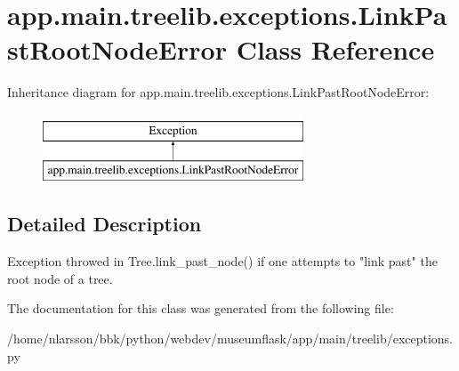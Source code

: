 \hypertarget{classapp_1_1main_1_1treelib_1_1exceptions_1_1LinkPastRootNodeError}{}\section{app.\+main.\+treelib.\+exceptions.\+Link\+Past\+Root\+Node\+Error Class Reference}
\label{classapp_1_1main_1_1treelib_1_1exceptions_1_1LinkPastRootNodeError}
Inheritance diagram for app.\+main.\+treelib.\+exceptions.\+Link\+Past\+Root\+Node\+Error\+:\begin{figure}[H]
\begin{center}
\leavevmode
\includegraphics[height=2.000000cm]{classapp_1_1main_1_1treelib_1_1exceptions_1_1LinkPastRootNodeError}
\end{center}
\end{figure}


\subsection{Detailed Description}
\begin{DoxyVerb}Exception throwed in Tree.link_past_node() if one attempts
to "link past" the root node of a tree.
\end{DoxyVerb}
 

The documentation for this class was generated from the following file\+:\begin{DoxyCompactItemize}
\item 
/home/nlarsson/bbk/python/webdev/museumflask/app/main/treelib/exceptions.\+py\end{DoxyCompactItemize}
